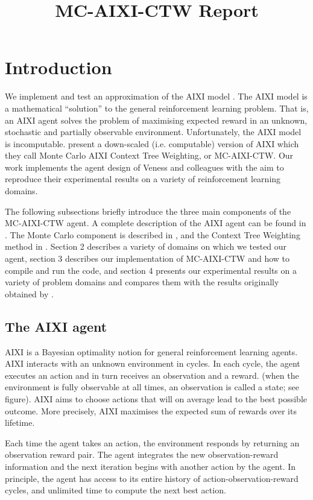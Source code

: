 \documentclass{article}
\title{MC-AIXI-CTW Report}
\theoremstyle{definition}
\newtheorem{primary statistics}[definition]{Primary Statistics}
\newtheorem{auxiliary statistics}[definition]{Auxiliary Statistics}
\begin{document}
\maketitle

\section{Introduction}
We implement and test an approximation of the AIXI model \citep{hutter2005universal}. The AIXI model is a mathematical “solution” to the general reinforcement learning problem. That is, an AIXI agent solves the problem of maximising expected reward in an unknown, stochastic and partially observable environment. Unfortunately, the AIXI model is incomputable. \citep{veness2011monte} present a down-scaled (i.e. computable) version of AIXI which they call Monte Carlo AIXI Context Tree Weighting, or MC-AIXI-CTW. Our work implements the agent design of Veness and colleagues with the aim to reproduce their experimental results on a variety of reinforcement learning domains.

The following subsections briefly introduce the three main components of the MC-AIXI-CTW agent. A complete description of the AIXI agent can be found in \citep{hutter2005universal}. The Monte Carlo component is described in \citep{kocsis2006bandit}, and the Context Tree Weighting method in \citep{willems1995context}.  Section 2 describes a variety of domains on which we tested our agent, section 3 describes our implementation of MC-AIXI-CTW and how to compile and run the code, and section 4 presents our experimental results on a variety of problem domains and compares them with the results originally obtained by \citep{veness2011monte}.

\subsection{The AIXI agent}
AIXI is a Bayesian optimality notion for general reinforcement learning agents. AIXI interacts with an unknown environment in cycles. In each cycle, the agent executes an action and in turn receives an observation and a reward. (when the environment is fully observable at all times, an observation is called a state; see figure). AIXI aims to choose actions that will on average lead to the best possible outcome. More precisely, AIXI maximises the expected sum of rewards over its lifetime.

Each time the agent takes an action, the environment responds by returning an observation reward pair. The agent integrates the new observation-reward information and the next iteration begins with another action by the agent. In principle, the agent has access to its entire history of action-observation-reward cycles, and unlimited time to compute the next best action.  
\end{document}
